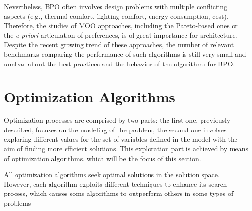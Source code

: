 	Nevertheless, \ac{BPO} often involves design problems with multiple conflicting aspects (e.g., thermal comfort, lighting comfort, energy consumption, cost). Therefore, the studies of \ac{MOO} approaches, including the Pareto-based ones or the \textit{a priori} articulation of preferences, is of great importance for architecture. Despite the recent growing trend of these approaches\cite{Evins2013,Wortmann2017Opossum}, the number of relevant benchmarks comparing the performance of such algorithms is still very small and unclear about the best practices and the behavior of the algorithms for \ac{BPO}.  

\section{Optimization Algorithms}
\label{sec:optimizationalgorithms}
	Optimization processes are comprised by two parts: the first one, previously described, focuses on the modeling of the problem; the second one involves exploring different values for the set of variables defined in the model with the aim of finding more efficient solutions. This exploration part is achieved by means of optimization algorithms, which will be the focus of this section. 
	
	All optimization algorithms seek optimal solutions in the solution space. However, each algorithm exploits different techniques to enhance its search process, which causes some algorithms to outperform others in some types of problems \cite{Wolpert1997NFLT}.
	
